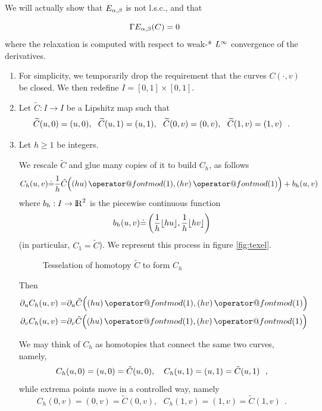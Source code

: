 \documentclass[twoside,a4paper,english]{article}
\makeatletter
\def\derpar#1{\partial_{#1}}
\def\mod{\mathop{\operator@font mod}\nolimits}
\makeatother
\begin{document}
We  will actually show that $E_{\alpha,\beta}$ is not l.s.c., and that
\begin{Proposition}\label{prop: relaxed 0}
  \[\Gamma E_{\alpha,\beta}(C)=0\]
  where the relaxation is computed with respect to weak-* $L^\infty$
  convergence of the derivatives.
\end{Proposition}

\begin{enumerate}
\item 
 For simplicity, we temporarily drop the
  requirement that the curves $C(\cdot,v)$ be closed. 
  We then redefine $I=[0,1]\times[0,1]$.

\item 
   Let  $\widetilde C:I\to I$ be a Lipshitz map such that
   \begin{equation}
     \widetilde C(u,0)= (u,0), ~~ \widetilde C(u,1)= (u,1), ~~
     \widetilde C(0,v) = (0,v), ~~\widetilde C(1,v) = (1,v) ~~.\label{eq:d3409fh}
   \end{equation}

 \item \label{item:tessel}
  Let $h\ge 1$ be integers.
 
 We rescale $\tilde C$ and glue many copies of it to build $C_h$, as
 follows
 \[ C_h(\t,v) \defeq 
 \frac 1 h \tilde C\Big( (h\t)\mod (1), (h v)\mod(1)\Big) 
 + b_h(\t,v) \]
 where $b_h:I\to{\protect\mathrm{l\hskip-0.15em R}}^2$ is the piecewise continuous function
 \[ b_h(u,v) {\stackrel{\mbox{.}}{=}} \left ( 
   \frac{1} h \lfloor hu \rfloor ,
   \frac{1} h \lfloor h v \rfloor 
 \right ) \]
 (in particular, $C_1=\tilde C$).
 We represent this process in figure \vref{fig:texel}.
 \begin{figure}[htbp]
  \centering
  
  \caption{Tesselation of homotopy $\tilde C$    to form $C_h$}
  \label{fig:texel}
\end{figure}


 Then
 \begin{eqnarray*}
   \derpar \t C_h(\t,v) = & \derpar \t \tilde C\Big( (h\t)\mod (1), (h v)\mod(1)\Big) \\
   \derpar  v C_h(\t,v) = & \derpar  v \tilde C\Big( (h\t)\mod (1), (h v)\mod(1)\Big)
 \end{eqnarray*} 

 We may think of $C_h$ as 
 homotopies that connect the same two curves, namely,
 \[ C_h(u,0)= (u,0)= \tilde C(u,0),~~~C_h(u,1)= (u,1)= \tilde C(u,1)~~,\]
 while extrema points move in a controlled way, namely
 \[ C_h(0,v)= (0,v)= \tilde C(0,v),~~~C_h(1,v)= (1,v)=\tilde C(1,v) ~~.\]


\end{enumerate}
\end{document}
